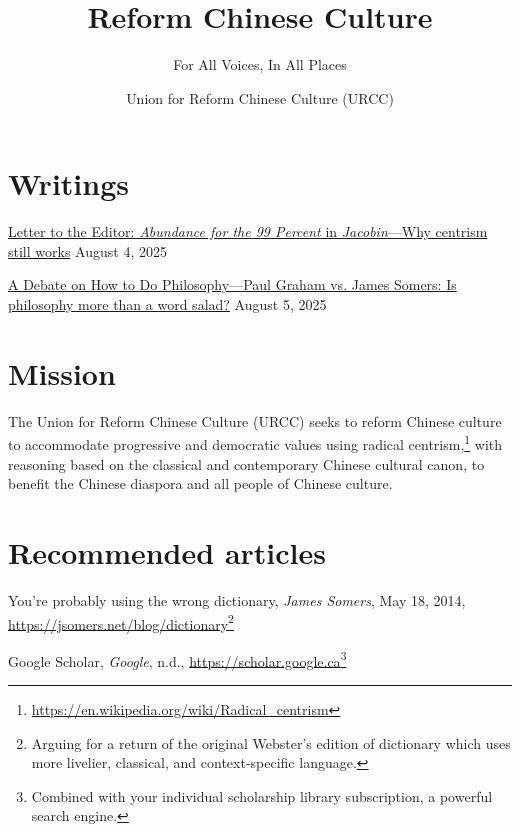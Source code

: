 \documentclass[12pt]{article}
\begin{document}
\title{Reform Chinese Culture}
\subtitle{For All Voices, In All Places}
\author{Union for Reform Chinese Culture (URCC)}

\maketitle

\section{Writings}

\href{202508Abundance.html}{Letter to the Editor: \textit{Abundance for the 99 Percent} in \textit{Jacobin}---Why centrism still works} August 4, 2025

\href{202508DebateOnPhilosophyPaulGrahamPG.html}{A Debate on How to Do
Philosophy---Paul Graham vs. James Somers: Is philosophy more than a word salad?} August 5, 2025

\section{Mission}

The Union for Reform Chinese Culture (URCC) seeks to reform Chinese culture to accommodate progressive and democratic values using radical centrism,\footnote{\href{https://en.wikipedia.org/wiki/Radical\_centrism}{https://en.wikipedia.org/wiki/Radical\_centrism}} with reasoning based on the classical and contemporary Chinese cultural canon, to benefit the Chinese diaspora and all people of Chinese culture.

\section{Recommended articles}

You're probably using the wrong dictionary, \emph{James Somers}, May 18, 2014, \href{https://jsomers.net/blog/dictionary}{https://jsomers.net/blog/dictionary}\footnote{Arguing for a return of the original Webster's edition of dictionary which uses more livelier, classical, and context-specific language.}

Google Scholar, \emph{Google}, n.d., \href{https://scholar.google.ca}{https://scholar.google.ca}\footnote{Combined with your individual scholarship library subscription, a powerful search engine.}

\end{document}
